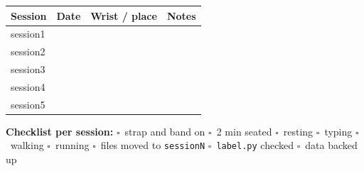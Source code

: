 \documentclass[11pt]{article}
\newcommand{\chk}{$\square$\ }
\begin{document}
\medskip
\renewcommand{\arraystretch}{2.1}
\begin{tabular}{@{}|p{0.75in}|p{0.85in}|p{1.0in}|p{3.35in}|@{}}
\hline
\textbf{Session} & \textbf{Date} & \textbf{Wrist / place} & \textbf{Notes} \\ \hline
session1 & & & \\ \hline
session2 & & & \\ \hline
session3 & & & \\ \hline
session4 & & & \\ \hline
session5 & & & \\ \hline
\end{tabular}

\vfill
\textbf{Checklist per session:} \chk strap and band on \quad \chk 2 min seated \quad \chk resting \quad
\chk typing \quad \chk walking \quad \chk running \quad \chk files moved to \texttt{sessionN} \quad
\chk \texttt{label.py} checked \quad \chk data backed up
\end{document}
